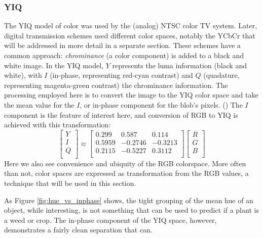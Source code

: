 \documentclass[letterpaper]{article}
\begin{document}
{\subsubsection{YIQ}
The YIQ model of color was used by the (analog) NTSC color TV system. Later, digital transmission schemes used different color spaces, notably the YCbCr that will be addressed in more detail in a separate section. These schemes have a common approach: \textit{chrominance} (a color component) is added to a black and white image. In the YIQ model, $Y$ represents the luma information (black and white), with $I$ (in-phase, representing red-cyan contrast) and $Q$ (quadature, representing magenta-green contrast) the chrominance information. 
The processing employed here is to convert the image to the YIQ color space and take the mean value for the $I$, or in-phase component for the blob's pixels. (\cite{MathWorks_undated-jg})
The $I$ component is the feature of interest here, and conversion of RGB to YIQ is achieved with this transformation:
\begin{equation}
	\begin{bmatrix}
	Y \\[0.3em]
	I \\[0.3em]
	Q \\[0.3em]
	\end{bmatrix}
	\approx
	\begin{bmatrix}
	0.299 & 0.587 & 0.114 \\[0.3em]
	0.5959 & -0.2746 & -0.3213\\[0.3em]
	0.2115 & -0.5227 & 0.3112 \\[0.3em]
	\end{bmatrix}
	\begin{bmatrix}
	R \\[0.3em]
	G \\[0.3em]
	B \\[0.3em]
	\end{bmatrix}	
\end{equation}
Here we also see convenience and ubiquity of the RGB colorspace. More often than not, color spaces are expressed as transformation from the RGB values, a technique that will be used in this section.

As Figure \ref{fig:hue_vs_inphase} shows, the tight grouping of the mean hue of an object, while interesting, is not something that can be used to predict if a plant is a weed or crop.  The in-phase component of the YIQ space, however, demonstrates a fairly clean separation that can.


}
\end{document}
